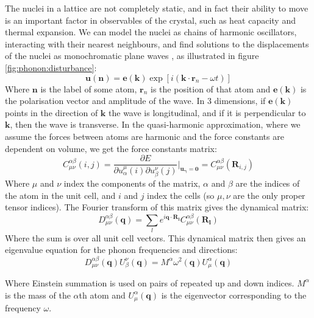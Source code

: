 \documentclass[12pt]{article}
\begin{document}
The nuclei in a lattice are not completely static, and in fact their ability to move is an important factor in observables of the crystal, such as heat capacity and thermal expansion. We can model the nuclei as chains of harmonic oscillators, interacting with their nearest neighbours, and find solutions to the displacements of the nuclei as monochromatic plane waves \cite{landau1980statistical}, as illustrated in figure \ref{fig:phonon:disturbance}:
\begin{equation}\label{eq:monochromatic_phonon}
	\mathbf u(\mathbf n) = \mathbf e(\mathbf k) \exp{[i(\mathbf k \cdot \mathbf r_n - \omega t)]}
\end{equation}
Where $\mathbf n$ is the label of some atom, $\mathbf r_n$ is the position of that atom and $\mathbf e(\mathbf k)$ is the polarisation vector and amplitude of the wave. In 3 dimensions, if $\mathbf e(\mathbf k)$ points in the direction of $\mathbf k$ the wave is longitudinal, and if it is perpendicular to $\mathbf k$, then the wave is transverse.
In the quasi-harmonic approximation, where we assume the forces between atoms are harmonic and the force constants are dependent on volume, we get the force constants matrix:
\begin{equation}\label{eq:force_constants}
	C^{\alpha\beta}_{\mu\nu}(i, j) = \frac{\partial E}{\partial u_\alpha^\mu(i)\partial u_\beta^\nu(j)}\Big |_{\mathbf {u_\gamma}=\mathbf 0}=C^{\alpha\beta}_{\mu\nu}(\mathbf R_{i, j})
\end{equation}
Where $\mu$ and $\nu$ index the components of the matrix, $\alpha$ and $\beta$ are the indices of the atom in the unit cell, and $i$ and $j$ index the cells (so $\mu,\nu$ are the only proper tensor indices). The Fourier transform of this matrix gives the dynamical matrix:
\begin{equation}\label{eq:dynamical_matrix}
	D^{\alpha\beta}_{\mu\nu}(\mathbf q) = \sum_le^{i\mathbf q \cdot \mathbf{R_l}}C^{\alpha\beta}_{\mu\nu}(\mathbf{R_l})
\end{equation}
Where the sum is over all unit cell vectors. This dynamical matrix then gives an eigenvalue equation for the phonon frequencies and directions:
\begin{equation}\label{eq:phonon_frequencies}
	D^{\alpha\beta}_{\mu\nu}(\mathbf q)U^\nu_\beta(\mathbf q) = M^\alpha \omega^2(\mathbf q) U_\mu^\alpha(\mathbf q)
\end{equation}

Where Einstein summation is used on pairs of repeated up and down indices. $M^\alpha$ is the mass of the $\alpha$th atom and $U^\alpha_\mu(\mathbf q)$ is the eigenvector corresponding to the frequency $\omega$.
\end{document}

